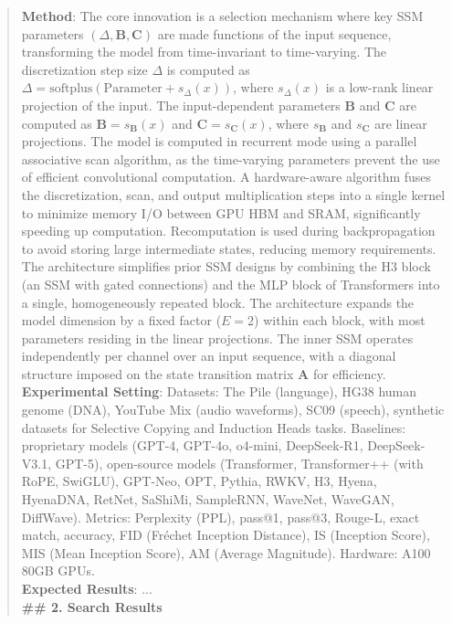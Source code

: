 \begin{quote}
\begin{tcolorbox}[breakable,colback=almond!20!white, colframe=almond!60!black, title=\textbf{Case Study (Mamba: Linear-Time Sequence Modeling with Selective State Spaces)}]
        \textbf{Method}: The core innovation is a selection mechanism where key SSM parameters $(\Delta, \boldsymbol{B}, \boldsymbol{C})$ are made functions of the input sequence, transforming the model from time-invariant to time-varying. The discretization step size $\Delta$ is computed as $\Delta = \textrm{softplus}(\textrm{Parameter} + s_\Delta(x))$, where $s_\Delta(x)$ is a low-rank linear projection of the input. The input-dependent parameters $\boldsymbol{B}$ and $\boldsymbol{C}$ are computed as $\boldsymbol{B} = s_{\boldsymbol{B}}(x)$ and $\boldsymbol{C} = s_{\boldsymbol{C}}(x)$, where $s_{\boldsymbol{B}}$ and $s_{\boldsymbol{C}}$ are linear projections. The model is computed in recurrent mode using a parallel associative scan algorithm, as the time-varying parameters prevent the use of efficient convolutional computation. A hardware-aware algorithm fuses the discretization, scan, and output multiplication steps into a single kernel to minimize memory I/O between GPU HBM and SRAM, significantly speeding up computation. Recomputation is used during backpropagation to avoid storing large intermediate states, reducing memory requirements. The architecture simplifies prior SSM designs by combining the H3 block (an SSM with gated connections) and the MLP block of Transformers into a single, homogeneously repeated block. The architecture expands the model dimension by a fixed factor ($E=2$) within each block, with most parameters residing in the linear projections. The inner SSM operates independently per channel over an input sequence, with a diagonal structure imposed on the state transition matrix $\boldsymbol{A}$ for efficiency.\\
        \textbf{Experimental Setting}: Datasets: The Pile (language), HG38 human genome (DNA), YouTube Mix (audio waveforms), SC09 (speech), synthetic datasets for Selective Copying and Induction Heads tasks. Baselines: proprietary models (GPT-4, GPT-4o, o4-mini, DeepSeek-R1, DeepSeek-V3.1, GPT-5), open-source models (Transformer, Transformer++ (with RoPE, SwiGLU), GPT-Neo, OPT, Pythia, RWKV, H3, Hyena, HyenaDNA, RetNet, SaShiMi, SampleRNN, WaveNet, WaveGAN, DiffWave). Metrics: Perplexity (PPL), pass@1, pass@3, Rouge-L, exact match, accuracy, FID (Fréchet Inception Distance), IS (Inception Score), MIS (Mean Inception Score), AM (Average Magnitude). Hardware: A100 80GB GPUs.\\
        \textbf{Expected Results}: ...\\

        \textbf{\#\# 2. Search Results}\\
        

\end{tcolorbox}
\end{quote}
